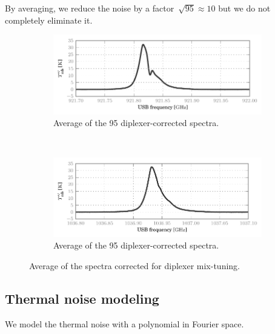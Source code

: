 By averaging, we reduce the noise by a factor~$\sqrt{95} \approx 10$ but we do not completely eliminate it.

\begin{figure}
    \centering
    \begin{subfigure}[b]{\textwidth}
        \centering
        \includegraphics{87_avera_corrected_tmb}
        \vspace{-.8em}
        \caption{Average of the 95  diplexer-corrected spectra.}
    \end{subfigure}
    \\
    \begin{subfigure}[b]{\textwidth}
        \centering
        \includegraphics{98_avera_corrected_tmb}
        \vspace{-.8em}
        \caption{Average of the 95  diplexer-corrected spectra.}
    \end{subfigure}
    \caption{Average of the spectra corrected for diplexer mix-tuning.}
    \label{fig:corrected_averaged}
\end{figure}

\subsection{Thermal noise modeling}
We model the thermal noise with a polynomial in Fourier space.

